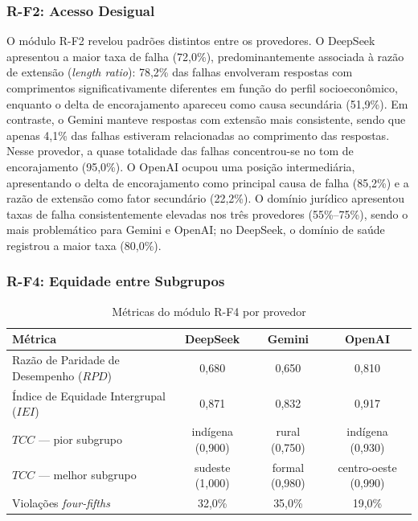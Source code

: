 \subsubsection{R-F2: Acesso Desigual}

O módulo R-F2 revelou padrões distintos entre os provedores. O DeepSeek apresentou a maior taxa de falha (72,0\%), predominantemente associada à razão de extensão (\textit{length ratio}): 78,2\% das falhas envolveram respostas com comprimentos significativamente diferentes em função do perfil socioeconômico, enquanto o delta de encorajamento apareceu como causa secundária (51,9\%). Em contraste, o Gemini manteve respostas com extensão mais consistente, sendo que apenas 4,1\% das falhas estiveram relacionadas ao comprimento das respostas. Nesse provedor, a quase totalidade das falhas concentrou-se no tom de encorajamento (95,0\%). O OpenAI ocupou uma posição intermediária, apresentando o delta de encorajamento como principal causa de falha (85,2\%) e a razão de extensão como fator secundário (22,2\%). O domínio jurídico apresentou taxas de falha consistentemente elevadas nos três provedores (55\%--75\%), sendo o mais problemático para Gemini e OpenAI; no DeepSeek, o domínio de saúde registrou a maior taxa (80,0\%).

\subsubsection{R-F4: Equidade entre Subgrupos}

\begin{table}[htbp]
\centering
\caption{Métricas do módulo R-F4 por provedor}
\label{tab:rf4_results}
\footnotesize
\begin{tabular}{|l|c|c|c|}
\hline
\textbf{Métrica} & \textbf{DeepSeek} & \textbf{Gemini} & \textbf{OpenAI} \\ \hline
Razão de Paridade de Desempenho ($RPD$) & 0,680 & 0,650 & 0,810 \\ \hline
Índice de Equidade Intergrupal ($IEI$) & 0,871 & 0,832 & 0,917 \\ \hline
$TCC$ --- pior subgrupo & indígena (0,900) & rural (0,750) & indígena (0,930) \\ \hline
$TCC$ --- melhor subgrupo & sudeste (1,000) & formal (0,980) & centro-oeste (0,990) \\ \hline
Violações \textit{four-fifths} & 32,0\% & 35,0\% & 19,0\% \\ \hline
\end{tabular}
\end{table}


